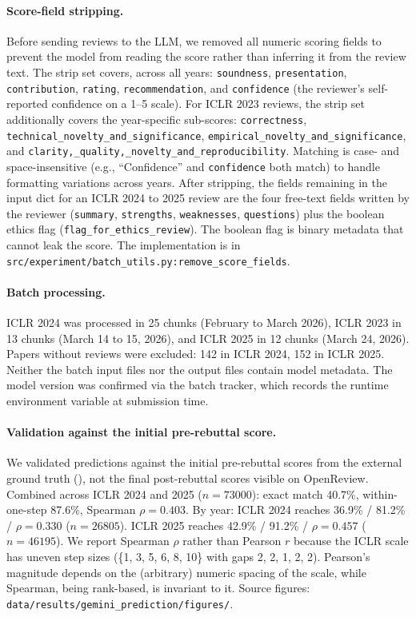 \documentclass{article}
\newcommand{\code}[1]{\texttt{#1}}
\begin{document}
\paragraph{Score-field stripping.}
Before sending reviews to the LLM, we removed all numeric scoring fields to prevent the model from reading the score rather than inferring it from the review text. The strip set covers, across all years: \code{soundness}, \code{presentation}, \code{contribution}, \code{rating}, \code{recommendation}, and \code{confidence} (the reviewer's self-reported confidence on a 1--5 scale). For ICLR 2023 reviews, the strip set additionally covers the year-specific sub-scores: \code{correctness}, \code{technical\_novelty\_and\_significance}, \code{empirical\_novelty\_and\_significance}, and \code{clarity,\_quality,\_novelty\_and\_reproducibility}. Matching is case- and space-insensitive (e.g., ``Confidence'' and \code{confidence} both match) to handle formatting variations across years. After stripping, the fields remaining in the input dict for an ICLR 2024 to 2025 review are the four free-text fields written by the reviewer (\code{summary}, \code{strengths}, \code{weaknesses}, \code{questions}) plus the boolean ethics flag (\code{flag\_for\_ethics\_review}). The boolean flag is binary metadata that cannot leak the score. The implementation is in \code{src/experiment/batch\_utils.py:remove\_score\_fields}.

\paragraph{Batch processing.}
ICLR 2024 was processed in 25 chunks (February to March 2026), ICLR 2023 in 13 chunks (March 14 to 15, 2026), and ICLR 2025 in 12 chunks (March 24, 2026). Papers without reviews were excluded: 142 in ICLR 2024, 152 in ICLR 2025. Neither the batch input files nor the output files contain model metadata. The model version was confirmed via the batch tracker, which records the runtime environment variable at submission time.

\paragraph{Validation against the initial pre-rebuttal score.}
We validated predictions against the initial pre-rebuttal scores from the external ground truth (), not the final post-rebuttal scores visible on OpenReview. Combined across ICLR 2024 and 2025 ($n = \num{73000}$): exact match 40.7\%, within-one-step 87.6\%, Spearman $\rho = 0.403$. By year: ICLR 2024 reaches 36.9\% / 81.2\% / $\rho = 0.330$ ($n = \num{26805}$). ICLR 2025 reaches 42.9\% / 91.2\% / $\rho = 0.457$ ($n = \num{46195}$). We report Spearman $\rho$ rather than Pearson $r$ because the ICLR scale has uneven step sizes (\{1, 3, 5, 6, 8, 10\} with gaps 2, 2, 1, 2, 2). Pearson's magnitude depends on the (arbitrary) numeric spacing of the scale, while Spearman, being rank-based, is invariant to it. Source figures: \code{data/results/gemini\_prediction/figures/}.
\end{document}
